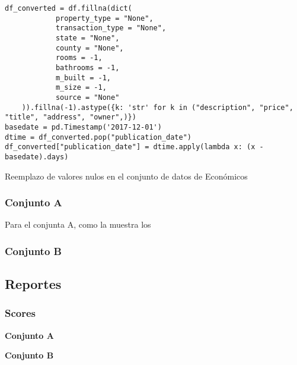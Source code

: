 \begin{listing}[H]
    \begin{verbatim}
df_converted = df.fillna(dict(
            property_type = "None",
            transaction_type = "None",
            state = "None",
            county = "None",
            rooms = -1,
            bathrooms = -1,
            m_built = -1,
            m_size = -1,
            source = "None"
    )).fillna(-1).astype({k: 'str' for k in ("description", "price", "title", "address", "owner",)})
basedate = pd.Timestamp('2017-12-01')
dtime = df_converted.pop("publication_date")
df_converted["publication_date"] = dtime.apply(lambda x: (x - basedate).days)
    \end{verbatim}
\caption{Reemplazo de valores nulos en el conjunto de datos de Económicos}
\label{codigo-replace-nan}
\end{listing}

\subsubsection{Conjunto A}
\label{ds-conjunto-a}
Para el conjunta A, como la  muestra los 










\subsubsection{Conjunto B}
\label{ds-conjunto-b2}


\subsection{Reportes}
\subsubsection{Scores}
\textbf{Conjunto A}






\textbf{Conjunto B}
\label{ds-conjunto-b}
